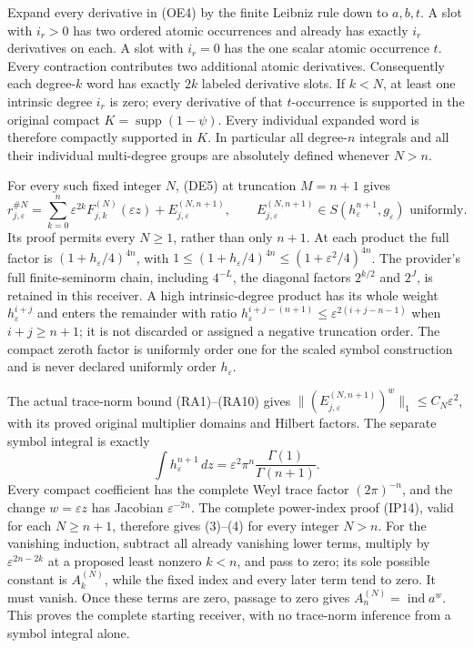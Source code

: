 \documentclass[
  11pt,
]{article}
\begin{document}
Expand every derivative in (OE4) by the finite Leibniz rule down to
\(a,b,t\). A slot with \(i_r>0\) has two ordered atomic occurrences and
already has exactly \(i_r\) derivatives on each. A slot with \(i_r=0\)
has the one scalar atomic occurrence \(t\). Every contraction
contributes two additional atomic derivatives. Consequently each
degree-\(k\) word has exactly \(2k\) labeled derivative slots. If
\(k<N\), at least one intrinsic degree \(i_r\) is zero; every derivative
of that \(t\)-occurrence is supported in the original compact
\(K=\operatorname{supp}(1-\psi)\). Every individual expanded word is
therefore compactly supported in \(K\). In particular all degree-\(n\)
integrals and all their individual multi-degree groups are absolutely
defined whenever \(N>n\).

For every such fixed integer \(N\), (DE5) at truncation \(M=n+1\) gives
\[
r_{j,\varepsilon}^{\#N}
 =\sum_{k=0}^{n}\varepsilon^{2k}
                F_{j,k}^{(N)}(\varepsilon z)
       +E_{j,\varepsilon}^{(N,n+1)},\qquad
E_{j,\varepsilon}^{(N,n+1)}
       \in S(h_\varepsilon^{n+1},g_\varepsilon)
                         \text{ uniformly}.
\tag{OE5}
\] Its proof permits every \(N\geq1\), rather than only \(n+1\). At each
product the full factor is \((1+h_\varepsilon/4)^{4n}\), with
\(1\leq(1+h_\varepsilon/4)^{4n}\leq(1+\varepsilon^2/4)^{4n}\). The
provider's full finite-seminorm chain, including \(4^{-L}\), the
diagonal factors \(2^{k/2}\) and \(2^J\), is retained in this receiver.
A high intrinsic-degree product has its whole weight
\(h_\varepsilon^{i+j}\) and enters the remainder with ratio
\(h_\varepsilon^{i+j-(n+1)}
\leq\varepsilon^{2(i+j-n-1)}\) when \(i+j\geq n+1\); it is not discarded
or assigned a negative truncation order. The compact zeroth factor is
uniformly order one for the scaled symbol construction and is never
declared uniformly order \(h_\varepsilon\).

The actual trace-norm bound (RA1)--(RA10) gives
\(\|(E_{j,\varepsilon}^{(N,n+1)})^w\|_1\leq C_N\varepsilon^2\), with its
proved original multiplier domains and Hilbert factors. The separate
symbol integral is exactly \[
\int h_\varepsilon^{n+1}\,dz
 =\varepsilon^2\pi^n
                    \frac{\Gamma(1)}{\Gamma(n+1)}.
\tag{OE6}
\] Every compact coefficient has the complete Weyl trace factor
\((2\pi)^{-n}\), and the change \(w=\varepsilon z\) has Jacobian
\(\varepsilon^{-2n}\). The complete power-index proof (IP14), valid for
each \(N\geq n+1\), therefore gives (3)--(4) for every integer \(N>n\).
For the vanishing induction, subtract all already vanishing lower terms,
multiply by \(\varepsilon^{2n-2k}\) at a proposed least nonzero \(k<n\),
and pass to zero; its sole possible constant is \(A_k^{(N)}\), while the
fixed index and every later term tend to zero. It must vanish. Once
these terms are zero, passage to zero gives
\(A_n^{(N)}=\operatorname{ind}a^w\). This proves the complete starting
receiver, with no trace-norm inference from a symbol integral alone.
\end{document}
